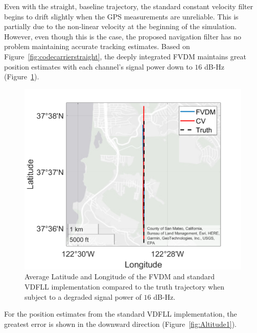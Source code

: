 Even with the straight, baseline trajectory, the standard constant velocity filter begins to drift slightly when the GPS measurements are unreliable. This is partially due to the non-linear velocity at the beginning of the simulation. However, even though this is the case, the proposed navigation filter has no problem maintaining accurate tracking estimates. Based on Figure~\ref{fig:codecarrierstraight}, the deeply integrated FVDM maintains great position estimates with each channel's signal power down to \(16\) dB-Hz (Figure~\ref{fig:GEOPLOT2}).

\begin{figure}[!ht]
    \centering
    \includegraphics[width=0.5\linewidth]{Figures/straight/15/GEOPLOT.png}
    \caption{Average Latitude and Longitude of the FVDM and standard VDFLL implementation compared to the truth trajectory when subject to a degraded signal power of \(16\) dB-Hz.}\label{fig:GEOPLOT2}
\end{figure}

For the position estimates from the standard VDFLL implementation, the greatest error is shown in the downward direction (Figure~\ref{fig:Altitude1}).


